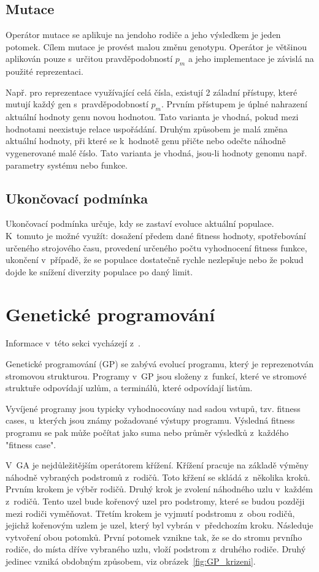 \subsection{Mutace}
Operátor mutace se aplikuje na jendoho rodiče a jeho výsledkem je jeden potomek.
Cílem mutace je provést malou změnu genotypu.
Operátor je většinou aplikován pouze s~určitou pravděpodobností $p_m$ a jeho implementace je závislá na použité reprezentaci.


Např. pro reprezentace využívající celá čísla, existují 2 záladní přístupy, které mutují každý gen s~pravděpodobností $p_m$.
Prvním přístupem je úplné nahrazení aktuální hodnoty genu novou hodnotou.
Tato varianta je vhodná, pokud mezi hodnotami neexistuje relace uspořádání.
Druhým způsobem je malá změna aktuální hodnoty, při které se k~hodnotě genu přičte nebo odečte náhodně vygenerované malé číslo.
Tato varianta je vhodná, jsou-li hodnoty genomu např. parametry systému nebo funkce.

\subsection{Ukončovací podmínka}
Ukončovací podmínka určuje, kdy se zastaví evoluce aktuální populace.
K~tomuto je možné využít: dosažení předem dané fitness hodnoty, spotřebování určeného strojového času, provedení určeného počtu vyhodnocení fitness funkce, ukončení v~případě, že se populace dostatečně rychle nezlepšuje nebo že pokud dojde ke snížení diverzity populace po daný limit.

\section{Genetické programování}
\label{sec:gp}

Informace v~této sekci vycházejí z~\cite{Koza1992}.

Genetické programování (GP) se zabývá evolucí programu, který je reprezenotván stromovou strukturou.
Programy v~GP jsou složeny z~funkcí, které ve stromové struktuře odpovídají uzlům, a terminálů, které odpovídají listům.

Vyvíjené programy jsou typicky vyhodnocovány nad sadou vstupů, tzv. fitness cases, u~kterých jsou známy požadované výstupy programu.
Výsledná fitness programu se pak může počítat jako suma nebo průměr výsledků z~každého "fitness case".

V~GA je nejdůležitějším operátorem křížení.
Křížení pracuje na základě výměny náhodně vybraných podstromů z~rodičů.
Toto křžení se skládá z~několika kroků.
Prvním krokem je výběr rodičů.
Druhý krok je zvolení náhodného uzlu v~každém z~rodičů.
Tento uzel bude kořenový uzel pro podstromy, které se budou později mezi rodiči vyměňovat.
Třetím krokem je vyjmutí podstromu z~obou rodičů, jejichž kořenovým uzlem je uzel, který byl vybrán v~předchozím kroku.
Následuje vytvoření obou potomků.
První potomek vznikne tak, že se do stromu prvního rodiče, do místa dříve vybraného uzlu, vloží podstrom z~druhého rodiče.
Druhý jedinec vzniká obdobným způsobem, viz obrázek~\ref{fig:GP_krizeni}.

